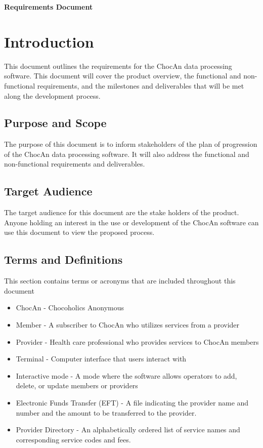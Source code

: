 \documentclass{article}
\renewcommand{\maketitle}{
   \begin{center}
      {\Huge \bfseries Requirements Document}
   \end{center}
}
\begin{document}
\maketitle
\tableofcontents

\section{Introduction}
This document outlines the requirements for the ChocAn data processing software. This document will cover the product overview, the functional and non-functional requirements, and the milestones and deliverables that will be met along the development process.

\subsection{Purpose and Scope}
The purpose of this document is to inform stakeholders of the plan of progression of the ChocAn data processing software. It will also address the functional and non-functional requirements and deliverables.

\subsection{Target Audience}
The target audience for this document are the stake holders of the product. Anyone holding an interest in the use or development of the ChocAn software can use this document to view the proposed process.

\subsection{Terms and Definitions}
This section contains terms or acronyms that are included throughout this document
\begin{itemize}
\item ChocAn - Chocoholics Anonymous
\item Member - A subscriber to ChocAn who utilizes services from a provider
\item Provider - Health care professional who provides services to ChocAn members
\item Terminal - Computer interface that users interact with
\item Interactive mode - A mode where the software allows operators to add, delete, or update members or providers
\item Electronic Funds Transfer (EFT) - A file indicating the provider name and number and the amount to be transferred to the provider.
\item Provider Directory - An alphabetically ordered list of service names and corresponding service codes and fees.
\end{itemize}
\end{document}
